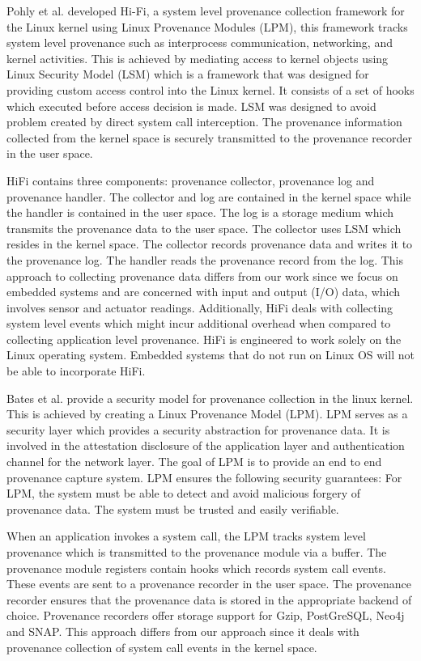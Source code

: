Pohly et al. \cite{hi_fi}  developed Hi-Fi, a system level provenance collection framework for the Linux kernel using Linux Provenance Modules (LPM), this framework tracks system level provenance such as interprocess communication, networking, and kernel activities. This is achieved by mediating access to kernel objects using Linux Security Model (LSM) which is a framework that was designed for providing custom access control into the Linux kernel. It consists of a set of hooks which executed before access decision is made. LSM was designed to avoid problem created by direct system call interception. The provenance information collected from the kernel space is securely transmitted to the provenance recorder in the user space. 
\par HiFi contains three components: provenance collector, provenance log and provenance handler. The collector and log are contained in the kernel space while the handler is contained in the user space. The log is a storage medium which transmits the provenance data to the user space. The collector uses LSM which resides in the kernel space. The collector records provenance data and writes it to the provenance log. The handler reads the provenance record from the log. This approach to collecting provenance data differs from our work since we focus on embedded systems and are concerned with input and output (I/O) data, which involves sensor and actuator readings. Additionally,  HiFi deals with collecting system level events which might incur additional overhead when compared to collecting application level provenance. HiFi is engineered to work solely on the Linux operating system. Embedded systems that do not run on Linux OS will not be able to incorporate HiFi. 

Bates et al. \cite{bates_towards_2013} provide a security model for provenance collection in the linux kernel. This is achieved by creating a Linux Provenance Model (LPM). LPM serves as a security layer which provides a security abstraction for provenance data. It is involved in the attestation disclosure of the application layer and authentication channel for the network layer. The goal of LPM is to provide an end to end provenance capture system. LPM ensures the following security guarantees: For LPM, the system must be able to detect and avoid malicious forgery of provenance data. The system must be trusted and easily verifiable. \par When an application invokes a system call, the LPM tracks system level provenance which is transmitted to the provenance module via a buffer. The provenance module registers contain hooks which records system call events. These events are sent to a provenance recorder in the user space. The provenance recorder ensures that the provenance data is stored in the appropriate backend of choice. Provenance recorders offer storage support for Gzip, PostGreSQL, Neo4j and SNAP. This approach differs from our approach since it deals with provenance collection of system call events in the kernel space.

